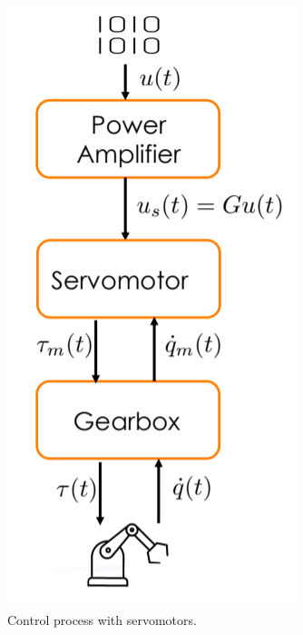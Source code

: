 \begin{figure} 
  \vspace{-1.5\baselineskip}
  \centering
  \includegraphics[width=\linewidth]{imgs/control_process_with_servomotors.png}
  \caption{Control process with servomotors.}
\end{figure}


